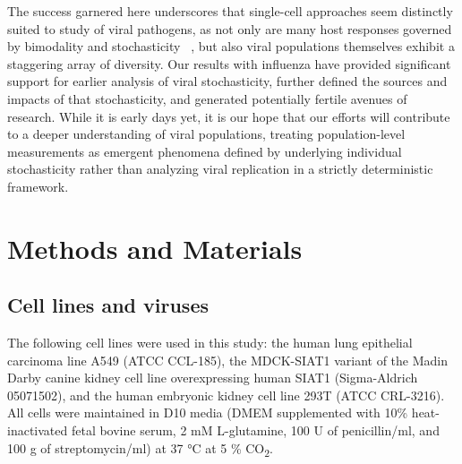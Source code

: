 \documentclass[9pt,lineno]{elife}
\begin{document}
The success garnered here underscores that single-cell approaches seem distinctly suited to study of viral pathogens, as not only are many host responses governed by bimodality and stochasticity ~\citep{Shalek:2014ey,Shalek:2013ej}, but also viral populations themselves exhibit a staggering array of diversity.
Our results with influenza have provided significant support for earlier analysis of viral stochasticity, further defined the sources and impacts of that stochasticity, and generated potentially fertile avenues of research. 
While it is early days yet, it is our hope that our efforts will contribute to a deeper understanding of viral populations, treating population-level measurements as emergent phenomena defined by underlying individual stochasticity rather than analyzing viral replication in a strictly deterministic framework.



\section{Methods and Materials}

\subsection{Cell lines and viruses}
The following cell lines were used in this study: the human lung epithelial carcinoma line A549 (ATCC CCL-185), the MDCK-SIAT1 variant of the Madin Darby canine kidney cell line overexpressing human SIAT1 (Sigma-Aldrich 05071502), and the human embryonic kidney cell line 293T (ATCC CRL-3216). 
All cells were maintained in D10 media (DMEM supplemented with 10\% heat-inactivated fetal bovine serum, 2 mM L-glutamine, 100 U of penicillin/ml, and 100 \si{\micro}g of streptomycin/ml) at 37 \si{\degreeCelsius} at 5 \% CO\textsubscript{2}.
\end{document}
